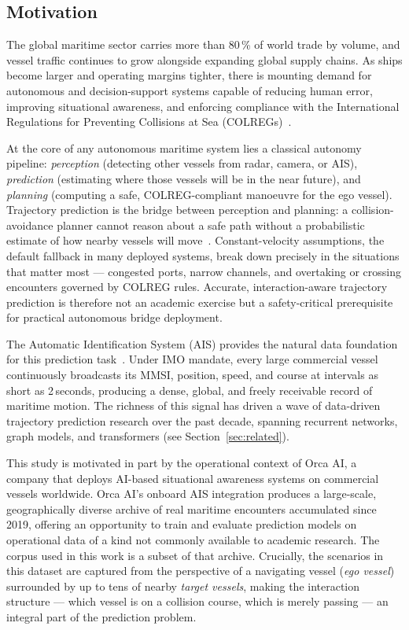 \documentclass[12pt, a4paper]{article}
\begin{document}
  \subsection{Motivation}

  The global maritime sector carries more than 80\,\% of world trade by volume, and vessel
  traffic continues to grow alongside expanding global supply chains.  As ships become larger
  and operating margins tighter, there is mounting demand for autonomous and decision-support
  systems capable of reducing human error, improving situational awareness, and enforcing
  compliance with the International Regulations for Preventing Collisions at Sea
  (COLREGs)~\citep{colregs1972}.

  At the core of any autonomous maritime system lies a classical autonomy pipeline:
  \textit{perception} (detecting other vessels from radar, camera, or AIS),
  \textit{prediction} (estimating where those vessels will be in the near future), and
  \textit{planning} (computing a safe, COLREG-compliant manoeuvre for the ego vessel).
  Trajectory prediction is the bridge between perception and planning: a collision-avoidance
  planner cannot reason about a safe path without a probabilistic estimate of how nearby
  vessels will move~\citep{kuwata2014safe, vagale2021path, mahipala2025colreg}.
  Constant-velocity assumptions, the default fallback in many deployed systems, break down
  precisely in the situations that matter most — congested ports, narrow channels, and
  overtaking or crossing encounters governed by COLREG rules.  Accurate, interaction-aware
  trajectory prediction is therefore not an academic exercise but a safety-critical
  prerequisite for practical autonomous bridge deployment.

  The Automatic Identification System (AIS) provides the natural data foundation for
  this prediction task~\citep{itu2014ais}.  Under IMO mandate, every large commercial
  vessel continuously broadcasts its MMSI, position, speed, and course at intervals as
  short as 2\,seconds, producing a dense, global, and freely receivable record of maritime
  motion.  The richness of this signal has driven a wave of data-driven trajectory
  prediction research over the past decade, spanning recurrent networks, graph models,
  and transformers (see Section~\ref{sec:related}).

  This study is motivated in part by the operational context of Orca AI, a company that
  deploys AI-based situational awareness systems on commercial vessels worldwide.
  Orca AI's onboard AIS integration produces a large-scale, geographically diverse
  archive of real maritime encounters accumulated since 2019, offering an opportunity
  to train and evaluate prediction models on operational data of a kind not commonly
  available to academic research.  The corpus used in this work is a subset of that
  archive.
  Crucially, the scenarios in this dataset are captured from the perspective of a navigating
  vessel (\textit{ego vessel}) surrounded by up to tens of nearby \textit{target vessels},
  making the interaction structure — which vessel is on a collision course, which is merely
  passing — an integral part of the prediction problem.
\end{document}
